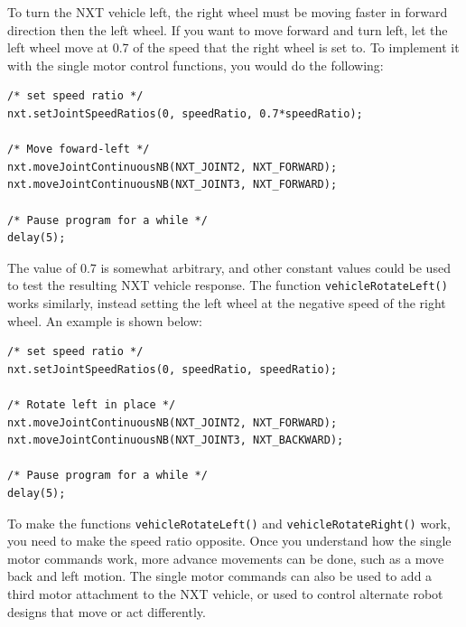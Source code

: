 \documentclass[11pt]{article}
\begin{document}
To turn the NXT vehicle left, the right wheel must be moving faster in forward 
direction then the left wheel. If you want to move forward and turn left, let 
the left wheel move at 0.7 of the speed that the right wheel is set to. To 
implement it with the single motor control functions, you would do the following:
\begin{lstlisting}
/* set speed ratio */
nxt.setJointSpeedRatios(0, speedRatio, 0.7*speedRatio);

/* Move foward-left */
nxt.moveJointContinuousNB(NXT_JOINT2, NXT_FORWARD);
nxt.moveJointContinuousNB(NXT_JOINT3, NXT_FORWARD);

/* Pause program for a while */
delay(5);
\end{lstlisting}
The value of 0.7 is somewhat arbitrary, and other constant values could be used 
to test the resulting NXT vehicle response. The function {\tt vehicleRotateLeft()} 
works similarly, instead setting the left wheel at the negative speed of the right 
wheel. An example is shown below:
\begin{lstlisting}
/* set speed ratio */
nxt.setJointSpeedRatios(0, speedRatio, speedRatio);

/* Rotate left in place */
nxt.moveJointContinuousNB(NXT_JOINT2, NXT_FORWARD);
nxt.moveJointContinuousNB(NXT_JOINT3, NXT_BACKWARD);

/* Pause program for a while */
delay(5);
\end{lstlisting}
To make the functions {\tt vehicleRotateLeft()} and {\tt vehicleRotateRight()} work, 
you need to make the speed ratio opposite. Once you understand how the single motor 
commands work, more advance movements can be done, such as a move back and left motion. 
The single motor commands can also be used to add a third motor attachment to the NXT 
vehicle, or used to control alternate robot designs that move or act differently.\\
\end{document}
